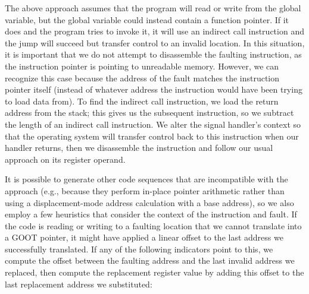 The above approach assumes that the program will read or write from the global
variable, but the global variable could instead contain a function pointer.  If it
does and the program tries to invoke it, it will use an indirect call instruction and
the jump will succeed but transfer control to an invalid location.  In this
situation, it is important that we do not attempt to disassemble the faulting
instruction, as the instruction pointer is pointing to unreadable memory.  However,
we can recognize this case because the address of the fault matches the instruction
pointer itself (instead of whatever address the instruction would have been trying to
load data from).  To find the indirect call instruction, we load the return address
from the stack; this gives us the subsequent instruction, so we subtract the length
of an indirect call instruction.  We alter the signal handler's context so that the
operating system will transfer control back to this instruction when our handler
returns, then we disassemble the instruction and follow our usual approach on its
register operand.

It is possible to generate other code sequences that are incompatible with the
approach (e.g., because they perform in-place pointer arithmetic rather than using a
displacement-mode address calculation with a base address), so we also employ a few
heuristics that consider the context of the instruction and fault.  If the code is
reading or writing to a faulting location that we cannot translate into a GOOT
pointer, it might have applied a linear offset to the last address we successfully
translated.  If any of the following indicators point to this, we compute the offset
between the faulting address and the last invalid address we replaced, then compute
the replacement register value by adding this offset to the last replacement address
we substituted:

